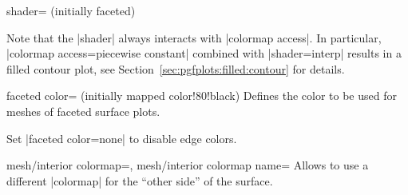 {\begin{pgfplotskey}{shader= (initially faceted)}
\pgfplotsexpensiveexample
\begin{codeexample}[]
\end{codeexample}

\pgfplotsexpensiveexample
\begin{codeexample}[]
\end{codeexample}

	Note that the |shader| always interacts with |colormap access|. In particular, |colormap access=piecewise constant| combined with |shader=interp| results in a filled contour plot, see Section~\ref{sec:pgfplots:filled:contour} for details.
\end{pgfplotskey}

\begin{pgfplotskey}{faceted color= (initially mapped color!80!black)}
	Defines the color to be used for meshes of faceted surface plots.

	Set |faceted color=none| to disable edge colors.
\end{pgfplotskey}

{
%
%
\begin{pgfplotskeylist}{%
	mesh/interior colormap=,%
	mesh/interior colormap name=}
	Allows to use a different |colormap| for the ``other side'' of the surface.


\end{pgfplotskeylist}}}
